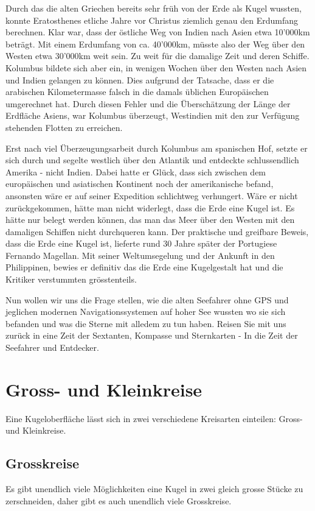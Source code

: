 \begin{refsection}
Durch das die alten Griechen bereits sehr früh von der Erde als Kugel wussten, konnte Eratosthenes etliche Jahre vor Christus ziemlich genau den Erdumfang berechnen. Klar war, dass der östliche Weg von Indien nach Asien etwa 10’000km beträgt. Mit einem Erdumfang von ca. 40’000km, müsste also der Weg über den Westen etwa 30’000km weit sein.
Zu weit für die damalige Zeit und deren Schiffe. Kolumbus bildete sich aber ein, in wenigen Wochen über den Westen nach Asien und Indien gelangen zu können. Dies aufgrund der Tatsache, dass er die arabischen Kilometermasse falsch in die damals üblichen Europäischen umgerechnet hat.
Durch diesen Fehler und die Überschätzung der Länge der Erdfläche Asiens, war Kolumbus überzeugt, Westindien mit den zur Verfügung stehenden Flotten zu erreichen.

Erst nach viel Überzeugungsarbeit durch Kolumbus am spanischen Hof, setzte er sich  durch und segelte westlich über den Atlantik und entdeckte schlussendlich Amerika - nicht Indien.
Dabei hatte er Glück, dass sich zwischen dem europäischen und asiatischen Kontinent noch der amerikanische befand, ansonsten wäre er auf seiner Expedition schlichtweg verhungert.
Wäre er nicht zurückgekommen, hätte man nicht widerlegt, dass die Erde eine Kugel ist.  Es hätte nur belegt werden können, das man das Meer über den Westen mit den damaligen Schiffen nicht durchqueren kann.
Der praktische und greifbare Beweis, dass die Erde eine Kugel ist, lieferte rund 30 Jahre später der Portugiese Fernando Magellan. Mit seiner Weltumsegelung und der Ankunft in den Philippinen, bewies er definitiv das die Erde eine Kugelgestalt hat und die Kritiker verstummten grösstenteils.

Nun wollen wir uns die Frage stellen, wie die alten Seefahrer ohne GPS und jeglichen modernen Navigationssystemen auf hoher See wussten wo sie sich befanden und was die Sterne mit alledem zu tun haben. Reisen Sie mit uns zurück in eine Zeit der Sextanten, Kompasse und Sternkarten - In die Zeit der Seefahrer und Entdecker.


\section{Gross- und Kleinkreise}
Eine Kugeloberfläche lässt sich in zwei verschiedene Kreisarten einteilen: Gross- und Kleinkreise. 

\subsection{Grosskreise}
Es gibt unendlich viele Möglichkeiten eine Kugel in zwei gleich grosse Stücke zu zerschneiden, daher gibt es auch unendlich viele Grosskreise.


\end{refsection}
